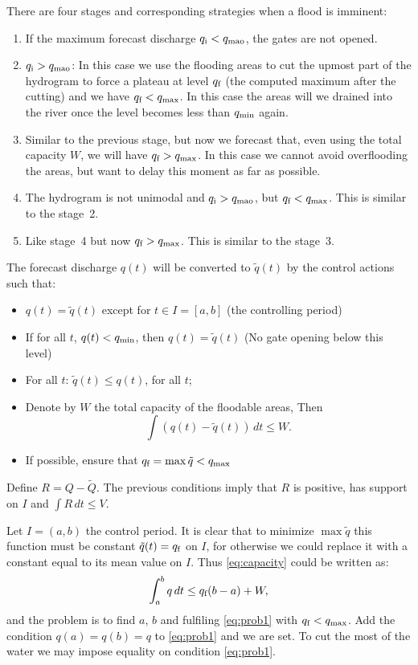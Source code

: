 There are four stages and corresponding strategies when a flood is
imminent:
\begin{enumerate}
\item If the maximum forecast discharge $q_{\mbox{\scriptsize i}}<q_{\mbox{\scriptsize mao}}$, the gates are not
opened. 
\item $q_{\mbox{\scriptsize i}}>q_{\mbox{\scriptsize mao}}$: In this case we use the flooding areas to cut the upmost
part of the hydrogram to force a plateau at level $q_{\mbox{\scriptsize f}}$ (the computed
maximum after the cutting) and we have $q_{\mbox{\scriptsize f}}<q_{\mbox{\scriptsize max}}$. In this case
the areas will we drained into the river once the level becomes less
than $q_{\mbox{\scriptsize min}}$ again.
\item Similar to the previous stage, but now we forecast that, even using
the total capacity $W$, we will have $q_{\mbox{\scriptsize f}}>q_{\mbox{\scriptsize max}}$. In this case we
cannot avoid overflooding the areas, but want to delay this moment as
far as possible.
\item The hydrogram is not unimodal and $q_{\mbox{\scriptsize i}}>q_{\mbox{\scriptsize mao}}$, but $q_{\mbox{\scriptsize f}}<q_{\mbox{\scriptsize max}}$.
This is similar to the stage~2.
\item Like stage~4 but now $q_{\mbox{\scriptsize f}}>q_{\mbox{\scriptsize max}}$. This is similar to the stage~3.
\end{enumerate}
The forecast discharge $q(t)$ will be converted to $\tilde{q}(t)$
by the control actions such that:
\begin{itemize}
\item $q(t)=\tilde{q}(t)$ except for $t\in I=[a,b]$ (the controlling period) 
\item If for all $t$, $q(t)<q_{\mbox{\scriptsize min}}$, then $q(t)=\tilde{q}(t)$ (No gate
opening below this level) 
\item For all $t$: $\tilde{q}(t)\leq q(t)$, for all $t$; 
\item Denote by $W$ the total capacity of the floodable areas, Then \begin{equation}
\int(q(t)-\tilde{q}(t))\, dt\leq W.\label{eq:capacity}\end{equation}

\item If possible, ensure that $q_{\mbox{\scriptsize f}}=\max\tilde{q}<q_{\mbox{\scriptsize max}}$ 
\end{itemize}
Define $R=Q-\tilde{Q}$. The previous conditions imply that $R$ is
positive, has support on $I$ and $\int R\, dt\leq V$. 

Let $I=(a,b)$ the control period. It is clear that to minimize $\max\tilde{q}$
this function must be constant $\tilde{q}(t)=q_{\mbox{\scriptsize f}}$ on $I$, for otherwise
we could replace it with a constant equal to its mean value on $I$.
Thus \eqref{eq:capacity} could be written as: \begin{equation}
\int_{a}^{b}q\, dt\leq q_{\mbox{\scriptsize f}}(b-a)+W,\label{eq:prob1}\end{equation}
 and the problem is to find $a$, $b$ and fulfiling \eqref{eq:prob1}
with $q_{\mbox{\scriptsize f}}<q_{\mbox{\scriptsize max}}$. Add the condition $q(a)=q(b)=q$ to \eqref{eq:prob1} and we
are set. To cut the most of the water we may impose equality on condition
\eqref{eq:prob1}. 


